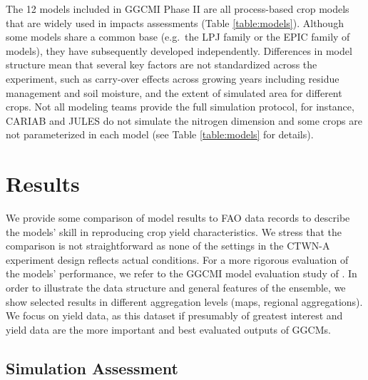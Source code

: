 \documentclass[gmd, manuscript]{copernicus} %
\begin{document}
{The 12 models included in GGCMI Phase II are all process-based crop models that are widely used in impacts assessments (Table \ref{table:models}). 
Although some models share a common base (e.g.\ the LPJ family or the EPIC family of models), they have subsequently developed independently. 
Differences in model structure mean that several key factors are not standardized across the experiment, such as carry-over effects across growing years including residue management and soil moisture, and the extent of simulated area for different crops. 
Not all modeling teams provide the full simulation protocol, for instance, CARIAB and JULES do not simulate the nitrogen dimension and some crops are not parameterized in each model (see Table \ref{table:models} for details). 

\section{Results}

We provide some comparison of model results to FAO data records to describe the models' skill in reproducing crop yield characteristics. 
We stress that the comparison is not straightforward as none of the settings in the CTWN-A experiment design reflects actual conditions. 
For a more rigorous evaluation of the models' performance, we refer to the GGCMI model evaluation study of \citet{muller_global_2017}. In order to illustrate the data structure and general features of the ensemble, we show selected results in different aggregation levels (maps, regional aggregations). 
We focus on yield data, as this dataset if presumably of greatest interest and yield data are the more important and best evaluated outputs of GGCMs.

\subsection{Simulation Assessment}
\label{S:3}

}
\end{document}

